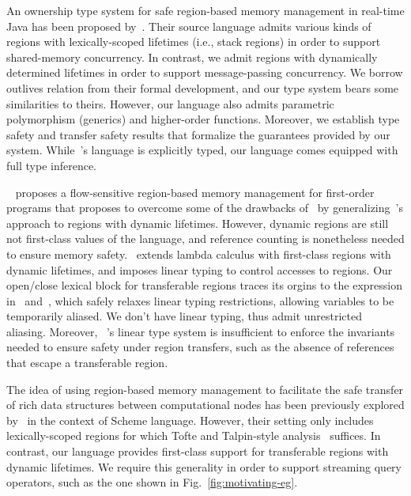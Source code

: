 An ownership type system for safe region-based memory management in
real-time Java has been proposed by~\cite{MIT03}.  
Their source language admits various kinds of regions with
lexically-scoped lifetimes (i.e., stack regions) in order to support
shared-memory concurrency. In contrast, we admit regions with
dynamically determined lifetimes in order to support message-passing
concurrency. We borrow outlives relation from their formal
development, and our type system bears some similarities to theirs.
However, our language also admits parametric polymorphism (generics)
and higher-order functions.
Moreover, we establish type safety and transfer safety results that
formalize the guarantees provided by our system. While~\cite{MIT03}'s
language is explicitly typed, our language comes equipped with full
type inference.

~\cite{HMN01} proposes a flow-sensitive region-based memory management
for first-order programs that proposes to overcome some of the
drawbacks of~\cite{tofte97} by generalizing~\cite{tofte97}'s approach
to regions with dynamic lifetimes. However, dynamic regions are still
not first-class values of the language, and reference counting is
nonetheless needed to ensure memory safety.~\cite{WW01} extends lambda
calculus with first-class regions with dynamic lifetimes, and imposes
linear typing to control accesses to regions. Our open/close lexical
block for transferable regions traces its orgins to the 
expression in~\cite{WW01} and~\cite{wadler90}, which safely relaxes
linear typing restrictions, allowing variables to be temporarily
aliased. We don't have linear typing, thus admit unrestricted
aliasing. 
Moreover, ~\cite{WW01}'s linear type system is insufficient to enforce
the invariants needed to ensure safety under region transfers, such as
the absence of references that escape a transferable region.

The idea of using region-based memory management to facilitate the
safe transfer of rich data structures between computational nodes has
been previously explored by~\cite{gpu14} in the context of Scheme
language. However, their setting only includes lexically-scoped
regions for which Tofte and Talpin-style analysis~\cite{tofte97}
suffices. In contrast, our language provides first-class support for
transferable regions with dynamic lifetimes. We require this
generality in order to support streaming query operators, such as the
one shown in Fig.~\ref{fig:motivating-eg}. 

